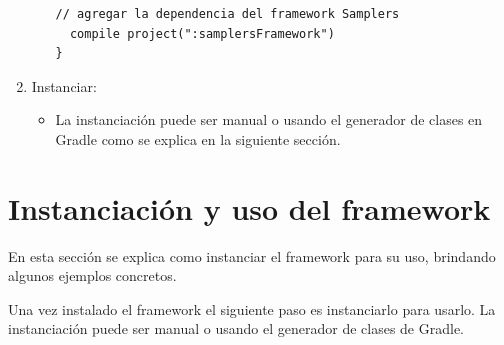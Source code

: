 \begin{enumerate}
\begin{itemize}
\begin{lstlisting}[language=XML, frame=tlb]
  // agregar la dependencia del framework Samplers
  compile project(":samplersFramework")
}
			\end{lstlisting}	
		\end{itemize}	

	\item Instanciar:
		\begin{itemize}
		\item La instanciación puede ser manual o usando el generador de clases en Gradle como se explica en la siguiente sección.
		\end{itemize}
\end{enumerate}	

\section{Instanciación y uso del framework}
En esta sección se explica como instanciar el framework para su uso, brindando algunos ejemplos concretos.

Una vez instalado el framework el siguiente paso es instanciarlo para usarlo. La instanciación puede ser manual o usando el generador de clases de Gradle.


